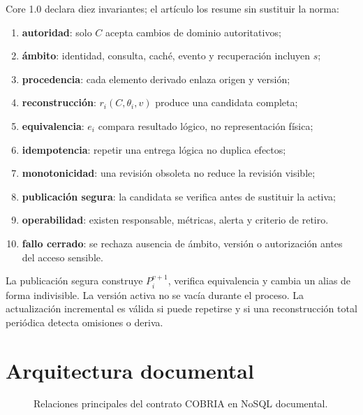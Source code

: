 \documentclass[12pt]{article}
\begin{document}
Core 1.0 declara diez invariantes; el artículo los resume sin sustituir la norma:
\begin{enumerate}[leftmargin=*]
\item \textbf{autoridad}: solo $C$ acepta cambios de dominio autoritativos;
\item \textbf{ámbito}: identidad, consulta, caché, evento y recuperación incluyen $s$;
\item \textbf{procedencia}: cada elemento derivado enlaza origen y versión;
\item \textbf{reconstrucción}: $r_i(C,\theta_i,v)$ produce una candidata completa;
\item \textbf{equivalencia}: $e_i$ compara resultado lógico, no representación física;
\item \textbf{idempotencia}: repetir una entrega lógica no duplica efectos;
\item \textbf{monotonicidad}: una revisión obsoleta no reduce la revisión visible;
\item \textbf{publicación segura}: la candidata se verifica antes de sustituir la activa;
\item \textbf{operabilidad}: existen responsable, métricas, alerta y criterio de retiro.
\item \textbf{fallo cerrado}: se rechaza ausencia de ámbito, versión o autorización
antes del acceso sensible.
\end{enumerate}

La publicación segura construye $P_i^{v+1}$, verifica equivalencia y cambia un alias de
forma indivisible. La versión activa no se vacía durante el proceso. La actualización
incremental es válida si puede repetirse y si una reconstrucción total periódica detecta
omisiones o deriva.

\section{Arquitectura documental}

\begin{figure}[H]\centering
{}
\caption{Relaciones principales del contrato COBRIA en NoSQL documental.}
\end{figure}
\end{document}
